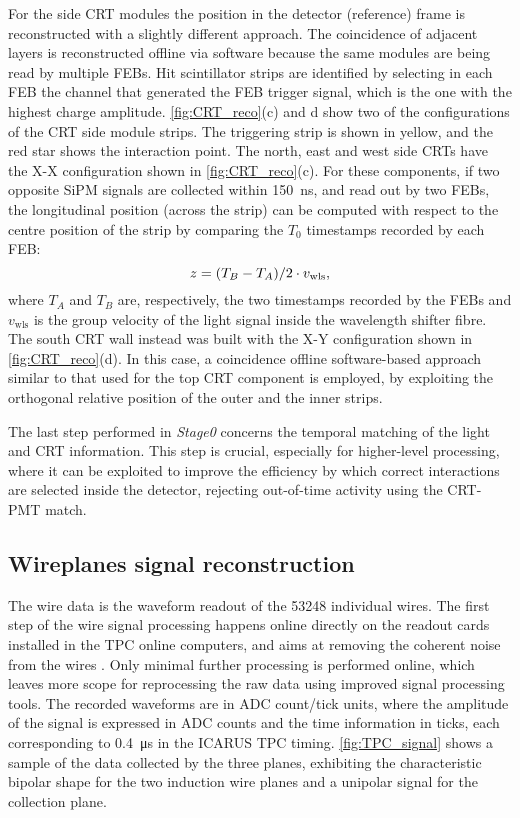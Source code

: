 For the side CRT modules the position in the detector (reference) frame is reconstructed with a slightly different approach. The coincidence of adjacent layers is reconstructed offline via software because the same modules are being read by multiple FEBs. Hit scintillator strips are identified by selecting in each FEB the channel that generated the FEB trigger signal, which is the one with the highest charge amplitude. \autoref{fig:CRT_reco}(c) and d show two of the configurations of the CRT side module strips. The triggering strip is shown in yellow, and the red star shows the interaction point. The north, east and west side CRTs have the X-X configuration shown in \autoref{fig:CRT_reco}(c). For these components, if two opposite SiPM signals are collected within \SI{150}{\ns}, and read out by two FEBs, the longitudinal position (across the strip) can be computed with respect to the centre position of the strip by comparing the $T_0$ timestamps recorded by each FEB:     \begin{equation}
    z = \qty(T_B - T_A)/2 \cdot v_\mathrm{wls}, 
\end{equation} where $T_A$ and $T_B$ are, respectively, the two timestamps recorded by the FEBs  and $v_\mathrm{wls}$ is the group velocity of the light signal inside the wavelength shifter fibre. The south CRT wall instead was built with the X-Y configuration shown in \autoref{fig:CRT_reco}(d). In this case, a coincidence offline software-based approach similar to that used for the top CRT component is employed, by exploiting the orthogonal relative position of the outer and the inner strips. 

The last step performed in \emph{Stage0} concerns the temporal matching of the light and CRT information. This step is crucial, especially for higher-level processing, where it can be exploited to improve the efficiency by which correct interactions are selected inside the detector, rejecting out-of-time activity using the CRT-PMT match. 

\subsection{Wireplanes signal reconstruction}

The wire data is the waveform readout of the \num{53248} individual wires. The first step of the wire signal processing happens online directly on the readout cards installed in the TPC online computers, and aims at removing the coherent noise from the wires \cite{MicroBooNE:2017qiu}. Only minimal further processing is performed online, which leaves more scope for reprocessing the raw data using improved signal processing tools. The recorded waveforms are in ADC count/tick units, where the amplitude of the signal is expressed in ADC counts and the time information in ticks, each corresponding to \SI{0.4}{\us} in the ICARUS TPC timing. \autoref{fig:TPC_signal} shows a sample of the data collected by the three planes, exhibiting the characteristic bipolar shape for the two induction wire planes and a unipolar signal for the collection plane. 

